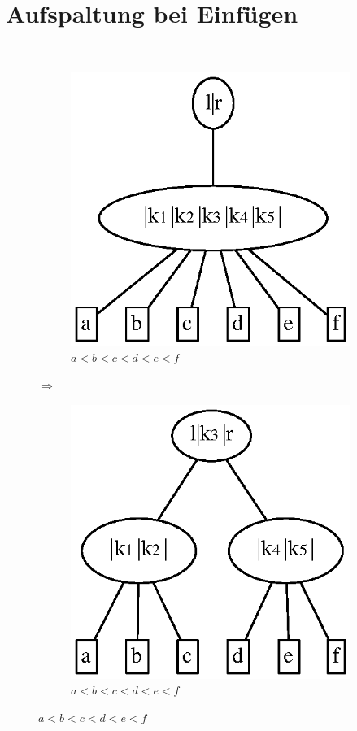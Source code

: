 \section{Aufspaltung bei Einfügen}
$ $
\begin{figure}[H]
	\centering
	\begin{subfigure}[H]{0.4\linewidth}
		\centering
		\includegraphics[width=\linewidth]{12/Grafik/graph4}
		\caption{$a<b<c<d<e<f$}
		\label{fig:graph4}
	\end{subfigure}
	{\Huge $\Rightarrow$}
	\begin{subfigure}[H]{0.4\linewidth}
		\centering
		\includegraphics[width=\linewidth]{12/Grafik/graph5}
		\caption{$a<b<c<d<e<f$}
		\label{fig:graph5}
	\end{subfigure}
\end{figure}
